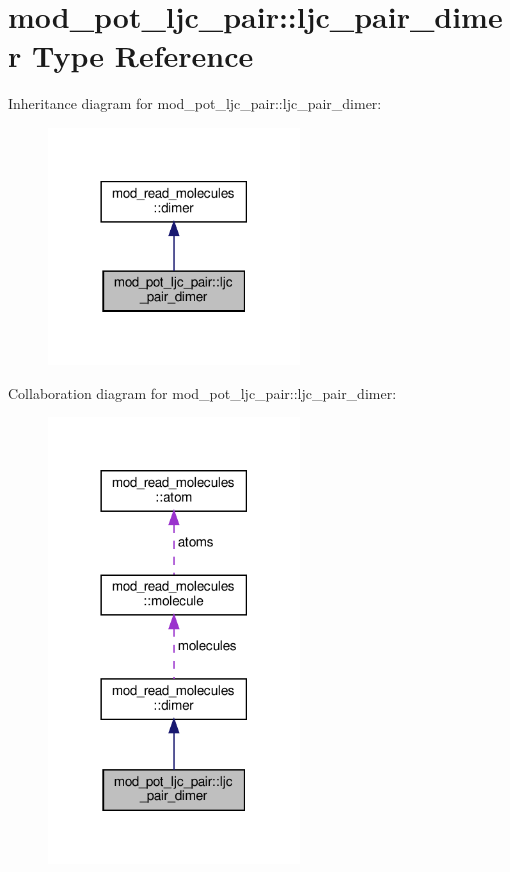 \hypertarget{structmod__pot__ljc__pair_1_1ljc__pair__dimer}{}\section{mod\+\_\+pot\+\_\+ljc\+\_\+pair\+:\+:ljc\+\_\+pair\+\_\+dimer Type Reference}
\label{structmod__pot__ljc__pair_1_1ljc__pair__dimer}


Inheritance diagram for mod\+\_\+pot\+\_\+ljc\+\_\+pair\+:\+:ljc\+\_\+pair\+\_\+dimer\+:
\nopagebreak
\begin{figure}[H]
\begin{center}
\leavevmode
\includegraphics[width=189pt]{structmod__pot__ljc__pair_1_1ljc__pair__dimer__inherit__graph}
\end{center}
\end{figure}


Collaboration diagram for mod\+\_\+pot\+\_\+ljc\+\_\+pair\+:\+:ljc\+\_\+pair\+\_\+dimer\+:
\nopagebreak
\begin{figure}[H]
\begin{center}
\leavevmode
\includegraphics[width=189pt]{structmod__pot__ljc__pair_1_1ljc__pair__dimer__coll__graph}
\end{center}
\end{figure}
